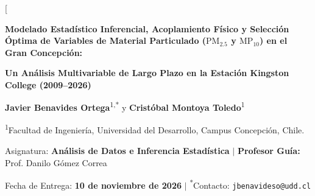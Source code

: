 \documentclass[10pt,twocolumn,a4paper]{article}
\begin{document}
\twocolumn[{%
  \vspace{-0.4cm}
  \begin{center}
    {\Large\bfseries\color{navyblue} Modelado Estadístico Inferencial, Acoplamiento Físico y Selección Óptima de Variables de Material Particulado ($\text{PM}_{2.5}$ y $\text{MP}_{10}$) en el Gran Concepción:}\par
    \vspace{0.18cm}
    {\large\bfseries\color{navyblue} Un Análisis Multivariable de Largo Plazo en la Estación Kingston College (2009--2026)}\par
    \vspace{0.30cm}
    
    {\normalsize\textbf{Javier Benavides Ortega}\textsuperscript{1,*} \quad y \quad \textbf{Cristóbal Montoya Toledo}\textsuperscript{1}}\par
    \vspace{0.12cm}
    {\footnotesize\textsuperscript{1}Facultad de Ingeniería, Universidad del Desarrollo, Campus Concepción, Chile.}\par
    \vspace{0.04cm}
    {\footnotesize Asignatura: \textbf{Análisis de Datos e Inferencia Estadística} \quad $|$ \quad \textbf{Profesor Guía:} Prof. Danilo Gómez Correa}\par
    \vspace{0.04cm}
    {\footnotesize Fecha de Entrega: \textbf{10 de noviembre de 2026} \quad $|$ \quad \textsuperscript{*}Contacto: \texttt{jbenavideso@udd.cl}}\par
    \vspace{0.25cm}
  \end{center}

}
\end{document}

